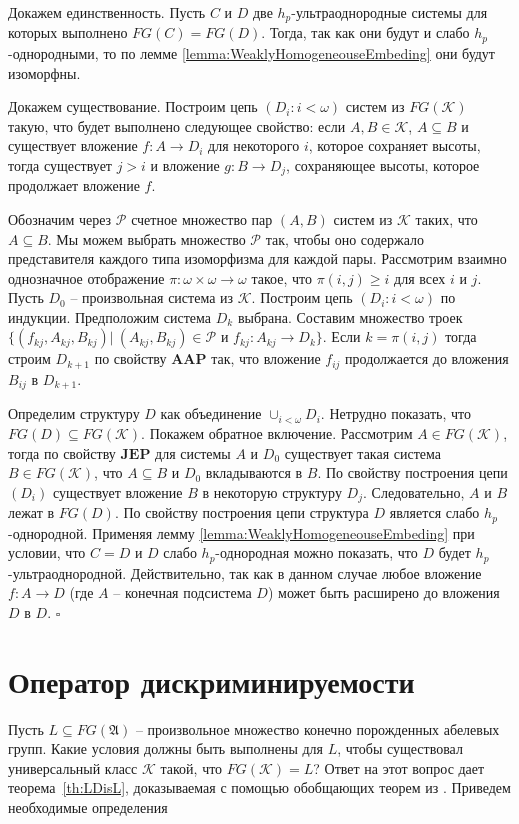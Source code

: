 \documentclass[12pt]{extarticle} %
\def\A{{\mathfrak{A}}}
\def\K{{\mathcal{K}}}
\def\P{{\mathcal{P}}}
\def\JEP{\textbf{JEP}}
\def\AAP{\textbf{AAP}}
\begin{document}
\medskip
{} Докажем единственность. Пусть $C$ и $D$ две $h_p$-ультраоднородные системы для которых выполнено $FG(C) = FG(D)$. Тогда, так как они будут и слабо $h_p$-однородными, то по лемме \ref{lemma:WeaklyHomogeneouseEmbeding} они будут изоморфны.

Докажем существование. Построим цепь $(D_i : i < \omega)$ систем из $FG(\K)$ такую, что будет выполнено следующее свойство: если $A, B \in \K$, $A \subseteq B$ и существует вложение $f: A \rightarrow D_i$ для некоторого $i$, которое сохраняет высоты, тогда существует $j > i$ и вложение $g : B \rightarrow D_j$, сохраняющее высоты, которое продолжает вложение $f$.

Обозначим через $\P$ счетное множество пар $(A, B)$ систем из $\K$ таких, что $A \subseteq B$. Мы можем выбрать множество $\P$ так, чтобы оно содержало представителя каждого типа изоморфизма для каждой пары. Рассмотрим взаимно однозначное отображение $\pi: \omega \times \omega \rightarrow \omega$ такое, что $\pi(i, j) \geq i$ для всех $i$ и $j$. Пусть $D_0$ -- произвольная система из $\K$. Построим цепь $(D_i : i < \omega)$ по индукции. Предположим система $D_k$ выбрана. Составим множество троек $\{(f_{kj}, A_{kj}, B_{kj}) |\ (A_{kj}, B_{kj}) \in \P \text{ и } f_{kj}: A_{kj} \rightarrow D_k \}$. Если $k = \pi(i,j)$ тогда строим $D_{k+1}$ по свойству $\AAP$ так, что вложение $f_{ij}$ продолжается до вложения $B_{ij}$ в $D_{k+1}$.


Определим структуру $D$ как объединение $\cup_{i < \omega} D_i$. Нетрудно показать, что $FG(D) \subseteq FG(\K)$. Покажем обратное включение. Рассмотрим $A \in FG(\K)$, тогда по свойству $\JEP$ для системы $A$ и $D_0$ существует такая система $B \in FG(\K)$, что $A \subseteq B$ и $D_0$ вкладываются в $B$. По свойству построения цепи $(D_i)$ существует вложение $B$ в некоторую структуру $D_j$. Следовательно, $A$ и $B$ лежат в $FG(D)$. По свойству построения цепи структура $D$ является слабо $h_p$-однородной. Применяя лемму \ref{lemma:WeaklyHomogeneouseEmbeding} при условии, что $C = D$ и $D$ слабо $h_p$-однородная можно показать, что $D$ будет $h_p$-ультраоднородной. Действительно, так как в данном случае любое вложение $f: A \rightarrow D$ (где $A$ -- конечная подсистема $D$) может быть расширено до вложения $D$ в $D$. $\square$  



\section{Оператор дискриминируемости} 
Пусть $L \subseteq FG(\A)$ -- произвольное множество конечно порожденных абелевых групп. Какие условия должны быть выполнены для $L$, чтобы существовал универсальный класс $\K$ такой, что $FG(\K) = L$? Ответ на этот вопрос дает теорема~\ref{th:LDisL}, доказываемая с помощью обобщающих теорем из \cite{DMR1, DMR2}. Приведем необходимые определения
\end{document}

